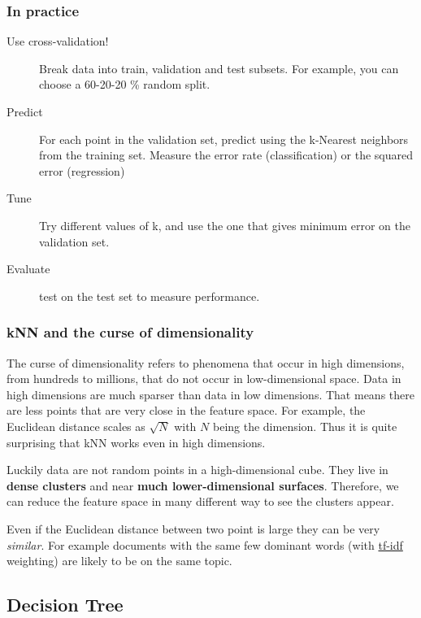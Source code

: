 \subsubsection*{In practice}

\begin{description}
 \item[Use cross-validation!] Break data into train, validation and test subsets. For example, you can choose a 60-20-20 \% random split.
 \item[Predict] For each point in the validation set, predict using the k-Nearest neighbors from the training set. Measure the error rate (classification) or the squared error (regression)
 \item[Tune] Try different values of k, and use the one that gives minimum error on the validation set.
 \item[Evaluate] test on the test set to measure performance.
\end{description}

\subsubsection{kNN and the curse of dimensionality}

The curse of dimensionality refers to phenomena that occur in high dimensions, from hundreds to millions, that do not occur in low-dimensional space. Data in high dimensions are much sparser than data in low dimensions. That means there are less points that are very close in the feature space. For example, the Euclidean distance scales as $\sqrt{N}$ with $N$ being the dimension. Thus it is quite surprising that kNN works even in high dimensions. 

Luckily data are not random points in a high-dimensional cube. They live in {\bf dense clusters} and near {\bf much lower-dimensional surfaces}. Therefore, we can reduce the feature space in many different way to see the clusters appear.

Even if the Euclidean distance between two point is large they can be very \emph{similar}. For example documents with the same few dominant words (with \href{https://en.wikipedia.org/wiki/Tf-idf}{tf-idf} weighting) are likely to be on the same topic.

\clearpage
\subsection{Decision Tree}

